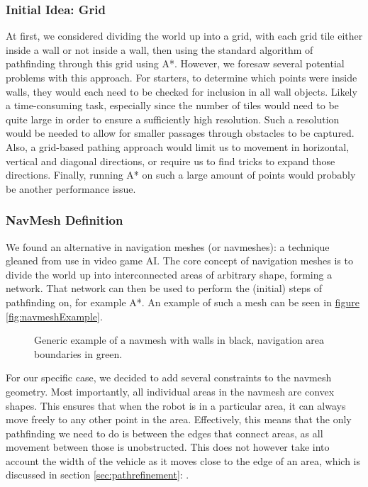 \documentclass[10pt, abstracton, twocolumn]{scrartcl}
\newcommand{\fref}[1]{\hyperref[#1]{figure \vref{#1}}}
\newcommand{\sref}[1]{section \vref{#1}: \nameref{#1}}
\begin{document}
\subsubsection{Initial Idea: Grid}
At first, we considered dividing the world up into a grid, with each grid tile either inside a wall or not inside a wall, then using the standard algorithm of pathfinding through this grid using A*. However, we foresaw several potential problems with this approach. For starters, to determine which points were inside walls, they would each need to be checked for inclusion in all wall objects. Likely a time-consuming task, especially since the number of tiles would need to be quite large in order to ensure a sufficiently high resolution. Such a resolution would be needed to allow for smaller passages through obstacles to be captured. Also, a grid-based pathing approach would limit us to movement in horizontal, vertical and diagonal directions, or require us to find tricks to expand those directions. Finally, running A* on such a large amount of points would probably be another performance issue.

\subsubsection{NavMesh Definition}
We found an alternative in navigation meshes (or navmeshes): a technique gleaned from use in video game AI. The core concept of navigation meshes is to divide the world up into interconnected areas of arbitrary shape, forming a network. That network can then be used to perform the (initial) steps of pathfinding on, for example A*. An example of such a mesh can be seen in \fref{fig:navmeshExample}.

\begin{figure}[h]
        \centering
        
        \caption{\small Generic example of a navmesh with walls in black, navigation area boundaries in green.}
        \label{fig:navmeshExample}
\end{figure}

For our specific case, we decided to add several constraints to the navmesh geometry. Most importantly, all individual areas in the navmesh  are convex shapes. This ensures that when the robot is in a particular area, it can always move freely to any other point in the area. Effectively, this means that the only pathfinding we need to do is between the edges that connect areas, as all movement between those is unobstructed. This does not however take into account the width of the vehicle as it moves close to the edge of an area, which is discussed in \sref{sec:pathrefinement}.
\end{document}
